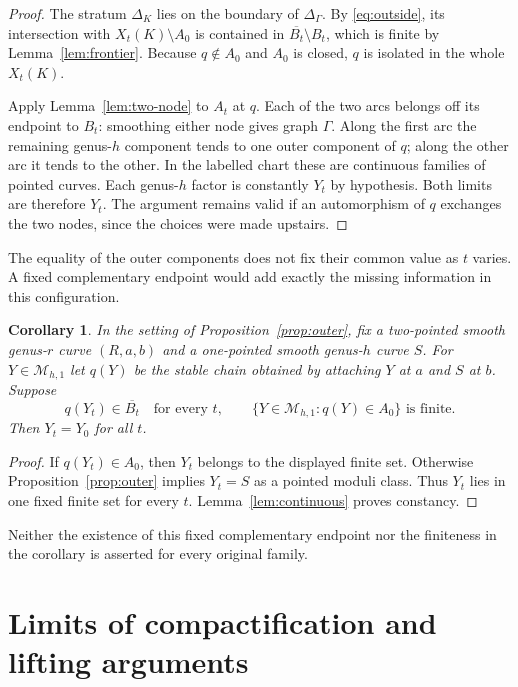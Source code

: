 \documentclass[11pt]{article}
\newcommand{\M}{\mathcal M}
\newcommand{\cl}[1]{\overline{#1}}
\newtheorem{corollary}[theorem]{Corollary}
\theoremstyle{definition}
\theoremstyle{remark}
\begin{document}
\begin{proof}
The stratum $\Delta_K$ lies on the boundary of $\Delta_\Gamma$. By \eqref{eq:outside}, its intersection with $X_t(K)\setminus A_0$ is contained in $\cl{B_t}\setminus B_t$, which is finite by Lemma~\ref{lem:frontier}. Because $q\notin A_0$ and $A_0$ is closed, $q$ is isolated in the whole $X_t(K)$.

Apply Lemma~\ref{lem:two-node} to $A_t$ at $q$. Each of the two arcs belongs off its endpoint to $B_t$: smoothing either node gives graph $\Gamma$. Along the first arc the remaining genus-$h$ component tends to one outer component of $q$; along the other arc it tends to the other. In the labelled chart these are continuous families of pointed curves. Each genus-$h$ factor is constantly $Y_t$ by hypothesis. Both limits are therefore $Y_t$. The argument remains valid if an automorphism of $q$ exchanges the two nodes, since the choices were made upstairs.
\end{proof}

The equality of the outer components does not fix their common value as $t$ varies. A fixed complementary endpoint would add exactly the missing information in this configuration.

\begin{corollary}\label{cor:fixed-complement}
In the setting of Proposition~\ref{prop:outer}, fix a two-pointed smooth genus-$r$ curve $(R,a,b)$ and a one-pointed smooth genus-$h$ curve $S$. For $Y\in\M_{h,1}$ let $q(Y)$ be the stable chain obtained by attaching $Y$ at $a$ and $S$ at $b$. Suppose
\[
 q(Y_t)\in\cl{B_t}\quad\text{for every }t,
 \qquad
 \{Y\in\M_{h,1}:q(Y)\in A_0\}\text{ is finite}.
\]
Then $Y_t=Y_0$ for all $t$.
\end{corollary}

\begin{proof}
If $q(Y_t)\in A_0$, then $Y_t$ belongs to the displayed finite set. Otherwise Proposition~\ref{prop:outer} implies $Y_t=S$ as a pointed moduli class. Thus $Y_t$ lies in one fixed finite set for every $t$. Lemma~\ref{lem:continuous} proves constancy.
\end{proof}

Neither the existence of this fixed complementary endpoint nor the finiteness in the corollary is asserted for every original family.

\section{Limits of compactification and lifting arguments}\label{sec:limits}
\end{document}
